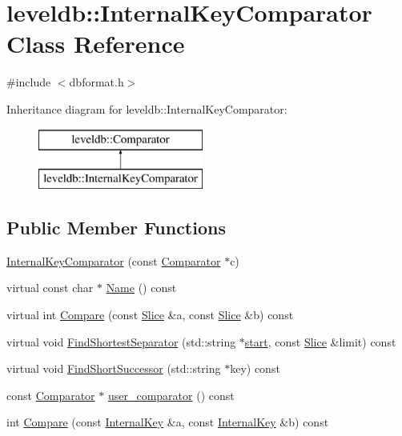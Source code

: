 \hypertarget{classleveldb_1_1_internal_key_comparator}{}\section{leveldb\+:\+:Internal\+Key\+Comparator Class Reference}
\label{classleveldb_1_1_internal_key_comparator}


{\ttfamily \#include $<$dbformat.\+h$>$}

Inheritance diagram for leveldb\+:\+:Internal\+Key\+Comparator\+:\begin{figure}[H]
\begin{center}
\leavevmode
\includegraphics[height=2.000000cm]{classleveldb_1_1_internal_key_comparator}
\end{center}
\end{figure}
\subsection*{Public Member Functions}
\begin{DoxyCompactItemize}
\item 
\hyperlink{classleveldb_1_1_internal_key_comparator_a0069a8b4828f592da66937e2c3471080}{Internal\+Key\+Comparator} (const \hyperlink{structleveldb_1_1_comparator}{Comparator} $\ast$c)
\item 
virtual const char $\ast$ \hyperlink{classleveldb_1_1_internal_key_comparator_a762ec9028955d3a5fc61fb5c718ff4f1}{Name} () const 
\item 
virtual int \hyperlink{classleveldb_1_1_internal_key_comparator_a6469a0d67a9025173d31ec6e1cd5f80e}{Compare} (const \hyperlink{classleveldb_1_1_slice}{Slice} \&a, const \hyperlink{classleveldb_1_1_slice}{Slice} \&b) const 
\item 
virtual void \hyperlink{classleveldb_1_1_internal_key_comparator_afe98c9042e34927e60e078fc103991bf}{Find\+Shortest\+Separator} (std\+::string $\ast$\hyperlink{db__bench_8cc_ab376b87f96a574a793c03c53e75afec8}{start}, const \hyperlink{classleveldb_1_1_slice}{Slice} \&limit) const 
\item 
virtual void \hyperlink{classleveldb_1_1_internal_key_comparator_a5dc88f433ef3a0d9508ec17cb40d3e27}{Find\+Short\+Successor} (std\+::string $\ast$key) const 
\item 
const \hyperlink{structleveldb_1_1_comparator}{Comparator} $\ast$ \hyperlink{classleveldb_1_1_internal_key_comparator_a86ca575a4560bb76e2bcebc0618abd31}{user\+\_\+comparator} () const 
\item 
int \hyperlink{classleveldb_1_1_internal_key_comparator_a4ff5764f03e6d8244c8798e0588552a7}{Compare} (const \hyperlink{classleveldb_1_1_internal_key}{Internal\+Key} \&a, const \hyperlink{classleveldb_1_1_internal_key}{Internal\+Key} \&b) const 
\end{DoxyCompactItemize}


